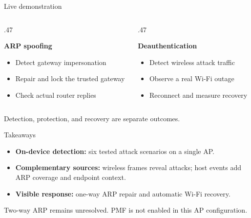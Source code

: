 \documentclass[aspectratio=169,11pt]{beamer}
\newcommand{\quiet}[1]{{\color{Muted}#1}}
\begin{document}
\begin{frame}{Live demonstration}
  \begin{columns}[T,onlytextwidth]
    \begin{column}{.47\textwidth}
      {\Large\color{Forest}\bfseries ARP spoofing\par}
      \vspace{4mm}
      \begin{itemize}\setlength{\itemsep}{4mm}
        \item Detect gateway impersonation
        \item Repair and lock the trusted gateway
        \item Check actual router replies
      \end{itemize}
    \end{column}
    \begin{column}{.47\textwidth}
      {\Large\color{Forest}\bfseries Deauthentication\par}
      \vspace{4mm}
      \begin{itemize}\setlength{\itemsep}{4mm}
        \item Detect wireless attack traffic
        \item Observe a real Wi-Fi outage
        \item Reconnect and measure recovery
      \end{itemize}
    \end{column}
  \end{columns}
  \vspace{7mm}
  \quiet{\large Detection, protection, and recovery are separate outcomes.}
\end{frame}

\begin{frame}{Takeaways}
  \begin{itemize}\setlength{\itemsep}{6mm}
    \item \textbf{On-device detection:} six tested attack scenarios on a single AP.
    \item \textbf{Complementary sources:} wireless frames reveal attacks; host events add ARP coverage and endpoint context.
    \item \textbf{Visible response:} one-way ARP repair and automatic Wi-Fi recovery.
  \end{itemize}
  \vspace{6mm}
  \quiet{\small Two-way ARP remains unresolved. PMF is not enabled in this AP configuration.}
\end{frame}
\end{document}
